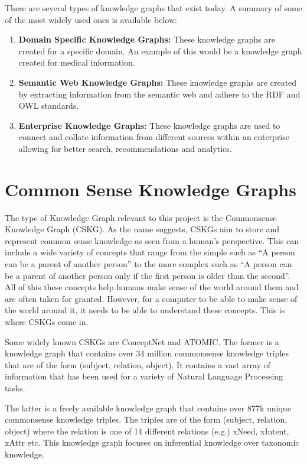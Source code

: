 \documentclass[\main/thesis.tex]{subfiles}
\begin{document}
There are several types of knowledge graphs that exist today. A summary of some of the
most widely used ones is available below: 

\begin{enumerate}
    \item \textbf{Domain Specific Knowledge Graphs:} These knowledge graphs are created for a
    specific domain. An example of this would be a knowledge graph created for medical information. 
    \item \textbf{Semantic Web Knowledge Graphs:} These knowledge graphs are created by
    extracting information from the semantic web and adhere to the RDF and OWL standards.
    \item \textbf{Enterprise Knowledge Graphs:} These knowledge graphs are used to connect 
    and collate information from different sources within an enterprise allowing for better 
    search, recommendations and analytics.
\end{enumerate}

\section{Common Sense Knowledge Graphs}\label{sec:commonsenseKnowledgeGraphs}

The type of Knowledge Graph relevant to this project is the Commonsense Knowledge Graph (CSKG). 
As the name suggests, CSKGs aim to store and represent common sense knowledge as seen 
from a human's perspective. This can include a wide variety of concepts that range from
the simple such as ``A person can be a parent of another person'' to the more complex such as
``A person can be a parent of another person only if the first person is older than the second''.
All of this these concepts help humans make sense of the world around them and are 
often taken for granted. However, for a computer to be able to make sense of the world
around it, it needs to be able to understand these concepts. This is where CSKGs come in.

Some widely known CSKGs are ConceptNet\cite{speer2018conceptnet} and 
ATOMIC\cite{sap_atomic_2018}. 
The former is a knowledge graph that contains over 34 million commonsense knowledge triples
that are of the form (subject, relation, object). It contains a vast array of information 
that has been used for a variety of Natural Language Processing tasks. 

The latter is a freely available knowledge graph that contains over 877k unique commonsense 
knowledge triples. The triples are of the form (subject, relation, object) where the 
relation is one of 14 different relations (e.g.) xNeed, xIntent, xAttr etc. 
This knowledge graph focuses on inferential knowledge over taxonomic knowledge.
\end{document}
